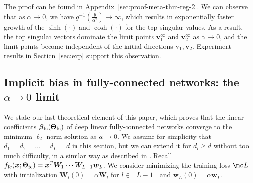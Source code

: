 \documentclass{article} %
\def\vv{{\bm{v}}}
\def\vw{{\bm{w}}}
\def\vx{{\bm{x}}}
\def\mW{{\bm{W}}}
\newcommand{\vbeta}{{\bm{\beta}}}
\newcommand{\vbetafc}{\vbeta_{\rm fc}}
\newcommand{\bTheta}{\bm{\Theta}}
\newcommand{\bThetafc}{\bTheta_{\rm fc}}
\newcommand{\ffc}{f_{\rm fc}}
\begin{document}
The proof can be found in Appendix~\ref{sec:proof-meta-thm-reg-2}. 
We can observe that as $\alpha \to 0$, we have $g^{-1} \left (\frac{y}{\alpha^2} \right) \to \infty$, which results in exponentially faster growth of the $\sinh(\cdot)$ and $\cosh(\cdot)$ for the top singular values. As a result, the top singular vectors dominate the limit points $\vv_1^\infty$ and $\vv_2^\infty$ as $\alpha \to 0$, and the limit points become independent of the initial directions $\bar \vv_1, \bar \vv_2$.
Experiment results in Section~\ref{sec:exp} support this observation.


\subsection{Implicit bias in fully-connected networks: the $\alpha \to 0$ limit}
We state our last theoretical element of this paper, which proves that the linear coefficients $\vbetafc(\bThetafc)$ of deep linear fully-connected networks converge to the minimum $\ell_2$ norm solution as $\alpha \to 0$.
We assume for simplicity that $d_1 = d_2 = \dots = d_L = d$ in this section, but we can extend it for $d_l \geq d$ without too much difficulty, in a similar way as described in \citet{wu2019global}.
Recall $\ffc(\vx; \bThetafc) = \vx^T \mW_1 \cdots \mW_{L-1} \vw_L$. We consider minimizing the training loss $\mc L$ with initialization $\mW_l(0) = \alpha \bar \mW_l$ for $l \in [L-1]$ and $\vw_L(0) = \alpha \bar \vw_L$.
\end{document}
